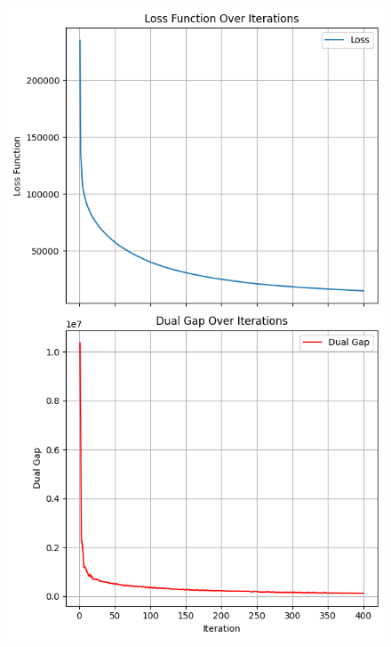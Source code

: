 \documentclass[12pt]{beamer}
\begin{document}
\begin{frame}
\begin{figure}[H]
        \includegraphics[height=0.75\textheight]{image/anime_loss_gap_line_search.png}
        \hspace{-0.2cm}

\end{figure}
\end{frame}
\end{document}
